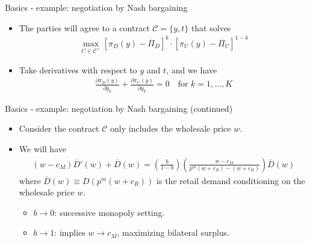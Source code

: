 \documentclass[aspectratio=169]{beamer}  %
\begin{document}
\begin{frame}{Basics - example: negotiation by Nash bargaining}
    \begin{itemize}
        \item The parties will agree to a contract $\mathcal{C} = \{y, t\}$ that solves 
        \begin{align}
            \max_{C \in \mathcal{C}^+} \left[ \pi_D(y) - \overline{\Pi}_D \right]^b \cdot \left[ \pi_U(y) - \overline{\Pi}_U \right]^{1-b}
        \end{align}
        \item Take derivatives with respect to $y$ and $t$, and we have
        \begin{align}
            \frac{\partial \pi_D(y)}{\partial y_k} + \frac{\partial \pi_U(y)}{\partial y_k} = 0 \quad \text{for } k = 1, \ldots, K
        \end{align}
            
    \end{itemize}
\end{frame}



\begin{frame}{Basics - example: negotiation by Nash bargaining (continued)}
    \begin{itemize}
        \item Consider the contract $\mathcal{C}$ only includes the wholesale price $w$. \vspace{.2cm}
        \item We will have
        \begin{align}
            (w - c_M) \overline{D}'(w) + \overline{D}(w) = ( \frac{b}{1 - b} ) (\frac{w-c_M}{p^m ( w + c_R) - (w + c_R)}) \overline{D}(w)
        \end{align}
        where $\overline{D}(w) \equiv D(p^m(w+c_R))$ is the retail demand conditioning on the wholesale price $w$. \vspace{.2cm}
        \begin{itemize}
            \item $b\rightarrow0$: successive monopoly setting. \vspace{.2cm}
            \item $b\rightarrow1$: implies $w\rightarrow c_M$, maximizing bilateral surplus. \vspace{.2cm}
        \end{itemize}
    \end{itemize}

\end{frame}
\end{document}

